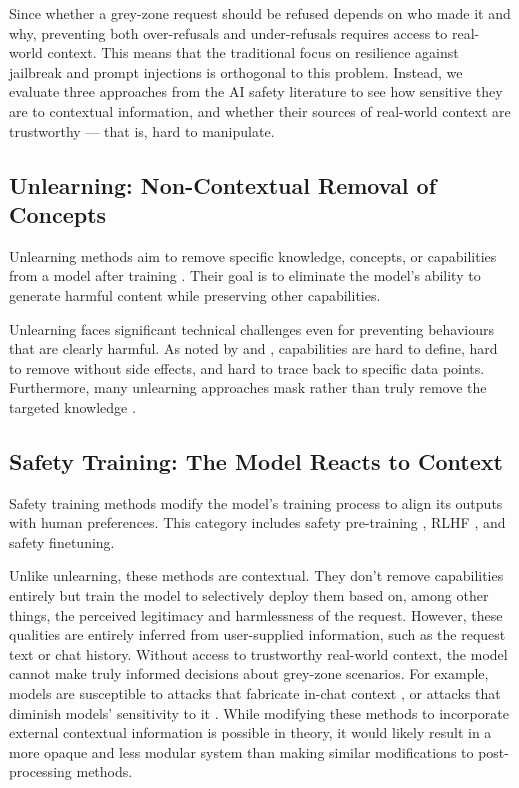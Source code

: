 \documentclass{article}
\theoremstyle{plain}
\theoremstyle{definition}
\theoremstyle{remark}
\begin{document}
Since whether a grey-zone request should be refused depends on who made it and why, preventing both over-refusals and under-refusals requires access to real-world context.
This means that the traditional focus on resilience against jailbreak and prompt injections is orthogonal to this problem.
Instead, we evaluate three approaches from the AI safety literature to see how sensitive they are to contextual information, and whether their sources of real-world context are trustworthy --- that is, hard to manipulate.

\subsection{Unlearning: Non-Contextual Removal of Concepts}

Unlearning methods aim to remove specific knowledge, concepts, or capabilities from a model after training \cite{liu2024rethinkingmachineunlearninglarge}.
Their goal is to eliminate the model's ability to generate harmful content while preserving other capabilities.

Unlearning faces significant technical challenges even for preventing behaviours that are clearly harmful.
As noted by \citet{cooper2024machineunlearningdoesntthink} and \citet{barez2025openproblemsmachineunlearning}, capabilities are hard to define, hard to remove without side effects, and hard to trace back to specific data points.
Furthermore, many unlearning approaches mask rather than truly remove the targeted knowledge \cite{deeb2025unlearningmethodsremoveinformation}.

\subsection{Safety Training: The Model Reacts to Context}

Safety training methods modify the model's training process to align
its outputs with human preferences.
This category includes safety pre-training \cite{maini2025safetypretraininggenerationsafe}, RLHF \cite{christiano2023deepreinforcementlearninghuman}, and safety finetuning.

Unlike unlearning, these methods are contextual.
They don't remove capabilities entirely but train the model to selectively deploy them based on, among other things, the perceived legitimacy and harmlessness of the request.
However, these qualities are entirely inferred from user-supplied information, such as the request text or chat history.
Without access to trustworthy real-world context, the model cannot make truly informed decisions about grey-zone scenarios.
For example, models are susceptible to attacks that fabricate in-chat context \cite{zeng2024johnnypersuadellmsjailbreak}, or attacks that diminish models' sensitivity to it \cite{russinovich2025greatwritearticlethat}.
While modifying these methods to incorporate external contextual information is possible in theory, it would likely result in a more opaque and less modular system than making similar modifications to post-processing methods.
\end{document}
